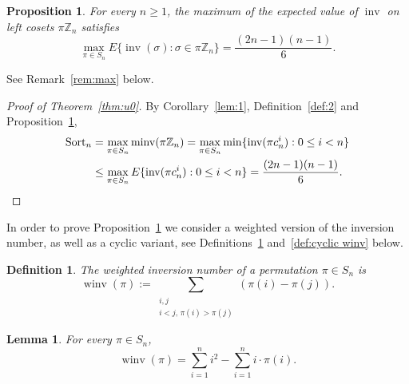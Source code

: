 \documentclass[11pt]{amsart}
\newtheorem{proposition}[theorem]{Proposition}
\newtheorem{lemma}[theorem]{Lemma}
\newtheorem{defn}[theorem]{Definition}
\numberwithin{equation}{section}
\newcommand{\ZZ}{{\mathbb {Z}}}
\newcommand{\inv}{{\operatorname{inv}}}
\newcommand{\minv}{{\operatorname{minv}}}
\newcommand{\winv}{{\operatorname{winv}}}
\newcommand{\cwinv}{{\operatorname{cwinv}}}
\newcommand{\Einv}{{\operatorname{Einv}}}
\newcommand{\dist}{{\operatorname{dist}}}
\newcommand{\Sort}{{\operatorname{Sort}}}
\begin{document}
\begin{proposition}\label{prop:u0}
    For every $n\ge 1$, the maximum of the expected value of $\inv$ on left cosets $\pi \ZZ_n$ satisfies 
    \[
        \max_{\pi \in S_n} E\{ \inv(\sigma): \sigma \in  \pi \ZZ_n\}
        = \frac{(2n-1)(n-1)}{6}.
    \]
\end{proposition}

See Remark~\ref{rem:max} below.

\begin{proof}[Proof of Theorem~\ref{thm:u0}]
    By %
    Corollary~\ref{lem:1}, Definition~\ref{def:2} 
    and Proposition~\ref{prop:u0},
\begin{align*}
    \Sort_n 
    &= \max_{\pi\in S_n} \minv(\pi \ZZ_n)
    = \max_{\pi\in S_n} \min \{\inv(\pi c_n^i): 0\le i<n\} \\
    &\le \max_{\pi\in S_n} E\{\inv(\pi c_n^i): 0\le i<n\}
    = \frac{(2n-1)(n-1)}{6}. 
    \qedhere
\end{align*}

\end{proof}


In order to prove Proposition~\ref{prop:u0} 
we consider a weighted version of the inversion number, as well as a cyclic variant, see Definitions~\ref{def:winv} and~\ref{def:cyclic winv} below. 

\begin{defn}\label{def:winv}
    The {\em weighted inversion number} of a permutation $\pi\in S_n$ is 
    \[
        \winv(\pi)
        := \sum_{\substack{i,j \\ i<j,\, \pi(i)>\pi(j)}} (\pi(i)-\pi(j)).
    \]
\end{defn}

\begin{lemma}\label{lem:u6}
    For every $\pi \in S_n$,
    \[
        \winv(\pi) 
        = \sum_{i=1}^n i^2 -
        \sum_{i=1}^n i\cdot \pi(i) .
    \]
\end{lemma}
\end{document}
